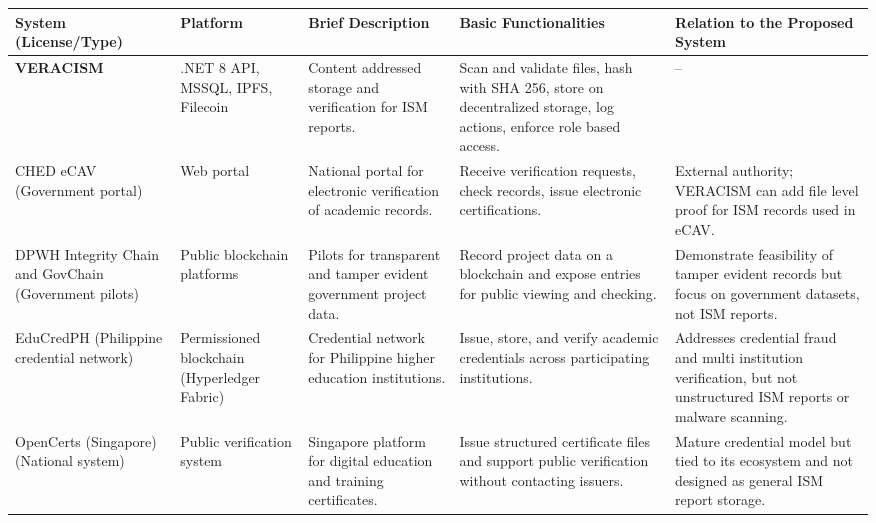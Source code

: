 \begin{center}
\captionsetup{type=table}

\smalltable
\scriptsize
\begin{tabular}{|>{\raggedright\arraybackslash}p{2.6cm}|
                >{\raggedright\arraybackslash}p{1.8cm}|
                >{\raggedright\arraybackslash}p{2.6cm}|
                >{\raggedright\arraybackslash}p{2.6cm}|
                >{\raggedright\arraybackslash}p{2.6cm}|}
\hline
\textbf{System (License/Type)} &
\textbf{Platform} &
\textbf{Brief Description} &
\textbf{Basic Functionalities} &
\textbf{Relation to the Proposed System} \\
\hline\hline

\textbf{VERACISM} &
.NET 8 API, MSSQL, IPFS, Filecoin &
Content addressed storage and verification for ISM reports. &
Scan and validate files, hash with SHA 256, store on decentralized storage, log actions, enforce role based access. &
-- \\
\hline

CHED eCAV (Government portal) &
Web portal &
National portal for electronic verification of academic records. &
Receive verification requests, check records, issue electronic certifications. &
External authority; VERACISM can add file level proof for ISM records used in eCAV. \\
\hline

DPWH Integrity Chain and GovChain (Government pilots) &
Public blockchain platforms &
Pilots for transparent and tamper evident government project data. &
Record project data on a blockchain and expose entries for public viewing and checking. &
Demonstrate feasibility of tamper evident records but focus on government datasets, not ISM reports. \\
\hline

EduCredPH (Philippine credential network) &
Permissioned blockchain (Hyperledger Fabric) &
Credential network for Philippine higher education institutions. &
Issue, store, and verify academic credentials across participating institutions. &
Addresses credential fraud and multi institution verification, but not unstructured ISM reports or malware scanning. \\
\hline

OpenCerts (Singapore) (National system) &
Public verification system &
Singapore platform for digital education and training certificates. &
Issue structured certificate files and support public verification without contacting issuers. &
Mature credential model but tied to its ecosystem and not designed as general ISM report storage. \\
\hline


\end{tabular}
\end{center}
